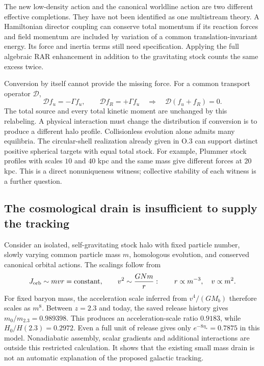 \documentclass[11pt]{article}
\begin{document}
The new low-density action and the canonical worldline action are two
different effective completions. They have not been identified as one
multistream theory. A Hamiltonian director coupling can conserve total
momentum if its reaction forces and field momentum are included by variation
of a common translation-invariant energy. Its force and inertia terms still
need specification. Applying the full algebraic RAR enhancement in addition
to the gravitating stock counts the same excess twice.

Conversion by itself cannot provide the missing force. For a common
transport operator $\mathcal D$,
\begin{equation}
 \mathcal D f_u=-\Gamma f_u,\qquad
 \mathcal D f_R=+\Gamma f_u
 \quad\Longrightarrow\quad
 \mathcal D(f_u+f_R)=0.
\end{equation}
The total source and every total kinetic moment are unchanged by this
relabeling. A physical interaction must change the distribution if conversion
is to produce a different halo profile. Collisionless evolution alone admits
many equilibria. The circular-shell realization already given in O.3 can
support distinct positive spherical targets with equal total stock. For
example, Plummer stock profiles with scales $10$ and $40$ kpc and the same
mass give different forces at $20$ kpc. This is a direct nonuniqueness witness;
collective stability of each witness is a further question.

\subsection{The cosmological drain is insufficient to supply the tracking}
Consider an isolated, self-gravitating stock halo with fixed particle number,
slowly varying common particle mass $m$, homologous evolution, and conserved
canonical orbital actions. The scalings follow from
\begin{equation}
 J_{\rm orb}\sim mvr=\text{constant},\qquad
 v^2\sim\frac{GN m}{r}:
 \qquad r\propto m^{-3},\quad v\propto m^2.
\end{equation}
For fixed baryon mass, the acceleration scale inferred from $v^4/(GM_b)$
therefore scales as $m^8$. Between $z=2.3$ and today, the saved release history
gives $m_0/m_{2.3}=0.989398$. This produces an acceleration-scale ratio
$0.9183$, while $H_0/H(2.3)=0.2972$. Even a full unit of release gives only
$e^{-8\eta_*}=0.7875$ in this model. Nonadiabatic assembly, scalar gradients
and additional interactions are outside this restricted calculation. It
shows that the existing small mass drain is not an automatic explanation
of the proposed galactic tracking.
\end{document}
